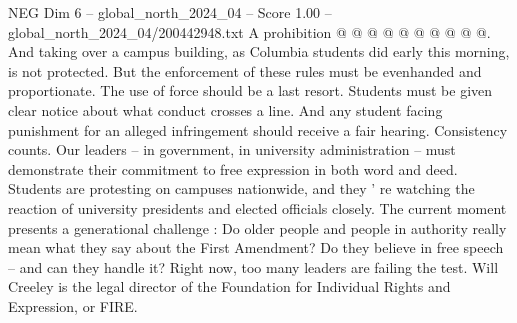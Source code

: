 \begin{textsample}{NEG Dim 6 – global\_north\_2024\_04 – Score 1.00 – global\_north\_2024\_04/200442948.txt}
A prohibition @ @ @ @ @ @ @ @ @ @.
And taking over a campus building, as Columbia students did early this morning, is not protected.
But the enforcement of these rules must be evenhanded and proportionate.
The use of force should be a last resort.
Students must be given clear notice about what conduct crosses a line.
And any student facing punishment for an alleged infringement should receive a fair hearing.
Consistency counts.
Our leaders -- in government, in university administration -- must demonstrate their commitment to free expression in both word and deed.
Students are protesting on campuses nationwide, and they ' re watching the reaction of university presidents and elected officials closely.
The current moment presents a generational challenge : Do older people and people in authority really mean what they say about the First Amendment?
Do they believe in free speech -- and can they handle it?
Right now, too many leaders are failing the test.
Will Creeley is the legal director of the Foundation for Individual Rights and Expression, or FIRE.

\end{textsample}
